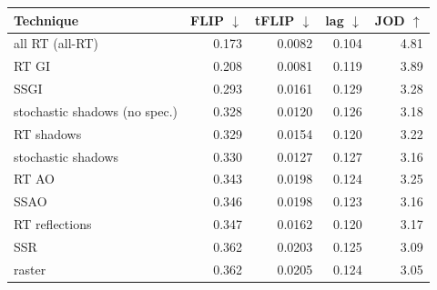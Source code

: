 \begin{tabular}{lrrrr}
\toprule
Technique & FLIP $\downarrow$ & tFLIP $\downarrow$ & lag $\downarrow$ & JOD $\uparrow$ \\
\midrule
all RT (all-RT)                  & 0.173 & 0.0082 & 0.104 & 4.81 \\
RT GI                            & 0.208 & 0.0081 & 0.119 & 3.89 \\
SSGI                             & 0.293 & 0.0161 & 0.129 & 3.28 \\
stochastic shadows (no spec.)    & 0.328 & 0.0120 & 0.126 & 3.18 \\
RT shadows                       & 0.329 & 0.0154 & 0.120 & 3.22 \\
stochastic shadows               & 0.330 & 0.0127 & 0.127 & 3.16 \\
RT AO                            & 0.343 & 0.0198 & 0.124 & 3.25 \\
SSAO                             & 0.346 & 0.0198 & 0.123 & 3.16 \\
RT reflections                   & 0.347 & 0.0162 & 0.120 & 3.17 \\
SSR                              & 0.362 & 0.0203 & 0.125 & 3.09 \\
raster                           & 0.362 & 0.0205 & 0.124 & 3.05 \\
\bottomrule
\end{tabular}
